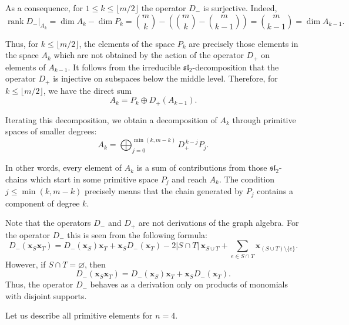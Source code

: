 \documentclass[10pt,a4paper]{amsart}
\begin{document}
As a consequence, for $1\le k\le \lfloor m/2\rfloor$ the operator
$
D_-
$
is surjective. Indeed,
$$
\operatorname{rank} D_-|_{A_k}
=
\dim A_k-\dim P_k
=
\binom{m}{k}
-
\left(\binom{m}{k}-\binom{m}{k-1}\right)
=
\binom{m}{k-1}
=
\dim A_{k-1}.
$$

Thus, for $k\le \lfloor m/2\rfloor$, the elements of the space $P_k$ are
precisely those elements in the space $A_k$ which are not obtained by the
action of the operator $D_+$ on elements of $A_{k-1}$.
It follows from the irreducible $\mathfrak{sl}_2$-decomposition that the
operator $D_+$ is injective on subspaces below the middle level. Therefore,
for $k\le \lfloor m/2\rfloor$, we have the direct sum
$$
A_k=P_k\oplus D_+(A_{k-1}).
$$

Iterating this decomposition, we obtain a decomposition of $A_k$ through
primitive spaces of smaller degrees:
\begin{equation} \label{P_to_A}
A_k
=
\bigoplus_{j=0}^{\min(k,m-k)}
D_+^{\,k-j}P_j.
\end{equation}

In other words, every element of $A_k$ is a sum of contributions from those
$\mathfrak{sl}_2$-chains which start in some primitive space $P_j$ and reach
$A_k$. The condition
$j\le \min(k,m-k)$ precisely means that the chain generated by $P_j$ contains
a component of degree $k$.

\medskip

Note that the operators $D_-$ and $D_+$ are not derivations of the graph
algebra. For the operator $D_-$ this is seen from the following formula:
$$
D_-(\boldsymbol{x}_S\boldsymbol{x}_T)
=
D_-(\boldsymbol{x}_S)\boldsymbol{x}_T
+
\boldsymbol{x}_S D_-(\boldsymbol{x}_T)
-
2|S\cap T|\,\boldsymbol{x}_{S\cup T}
+
\sum_{e\in S\cap T}
\boldsymbol{x}_{(S\cup T)\setminus\{e\}}.
$$
However, if $S\cap T=\varnothing$, then
\begin{equation}\label{Leibniz}
D_-(\boldsymbol{x}_S\boldsymbol{x}_T)=D_-(\boldsymbol{x}_S)\boldsymbol{x}_T+\boldsymbol{x}_SD_-(\boldsymbol{x}_T).
\end{equation}
Thus, the operator $D_-$ behaves as a derivation only on products of monomials
with disjoint supports.


\medskip

Let us describe all primitive elements for $n=4$.
\end{document}
